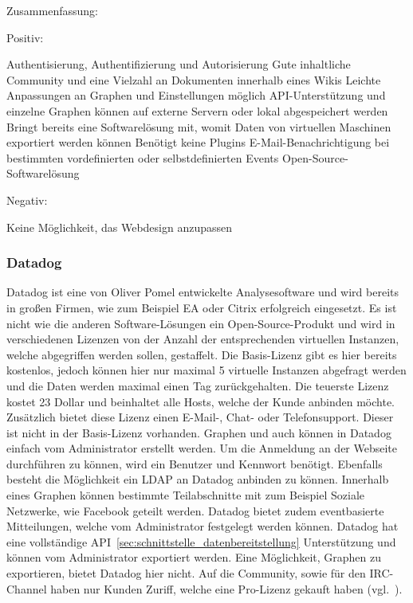 Zusammenfassung:

Positiv:

\begin{outline}
  \1 Authentisierung, Authentifizierung und Autorisierung
  \1 Gute inhaltliche Community und eine Vielzahl an Dokumenten innerhalb
  eines Wikis
  \1 Leichte Anpassungen an Graphen und Einstellungen möglich
  \1 \gls{API}\hyp{}Unterstützung
  \1  und einzelne Graphen können auf externe
  Servern oder lokal abgespeichert werden
  \1 Bringt bereits eine Softwarelösung mit, womit Daten von virtuellen
  Maschinen exportiert werden können
  \1 Benötigt keine Plugins
  \1 E\hyp{}Mail\hyp{}Benachrichtigung bei bestimmten vordefinierten oder
  selbstdefinierten Events
  \1 Open\hyp{}Source\hyp{}Softwarelösung
\end{outline}

Negativ:

\begin{outline}
  \1 Keine Möglichkeit, das Webdesign anzupassen
\end{outline}
\mr%

\subsubsection{Datadog}
\label{subsubsec:datadog}
Datadog ist eine von Oliver Pomel entwickelte Analysesoftware und wird bereits
in großen Firmen, wie zum Beispiel EA oder Citrix erfolgreich eingesetzt. Es
ist nicht wie die anderen Software\hyp{}Lösungen ein
Open\hyp{}Source\hyp{}Produkt und wird in verschiedenen Lizenzen von der Anzahl
der entsprechenden virtuellen Instanzen, welche abgegriffen werden sollen,
gestaffelt. Die Basis\hyp{}Lizenz gibt es hier bereits kostenlos, jedoch können
hier nur maximal 5 virtuelle Instanzen abgefragt werden und die Daten werden
maximal einen Tag zurückgehalten. Die teuerste Lizenz kostet 23 Dollar und
beinhaltet alle Hosts, welche der Kunde anbinden möchte. Zusätzlich bietet
diese Lizenz einen E\hyp{}Mail\hyp{}, Chat\hyp{} oder Telefonsupport. Dieser
ist nicht in der Basis\hyp{}Lizenz vorhanden. Graphen und auch
 können in Datadog einfach vom Administrator
erstellt werden. Um die Anmeldung an der Webseite durchführen zu können, wird
ein Benutzer und Kennwort benötigt. Ebenfalls besteht die Möglichkeit ein
\gls{LDAP} an Datadog anbinden zu können. Innerhalb eines Graphen können
bestimmte Teilabschnitte mit zum Beispiel Soziale Netzwerke, wie Facebook
geteilt werden. Datadog bietet zudem eventbasierte Mitteilungen, welche vom
Administrator festgelegt werden können. Datadog hat eine vollständige
\gls{API}~\ref{sec:schnittstelle_datenbereitstellung} Unterstützung und
 können vom Administrator exportiert werden.
Eine Möglichkeit, Graphen zu exportieren, bietet Datadog hier nicht. Auf die
Community, sowie für den \gls{IRC-Channel}  haben nur Kunden Zuriff, welche
eine Pro\hyp{}Lizenz gekauft haben (vgl.~\cite{datadog}).

